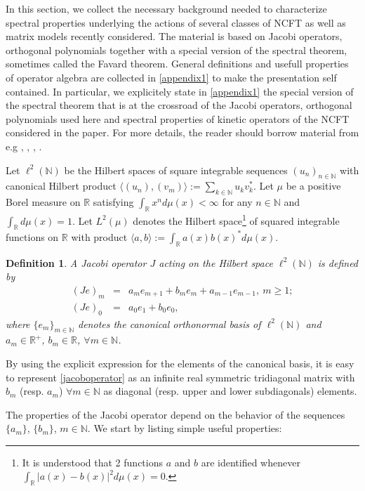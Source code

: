 \documentclass[a4paper]{jpconf}
\numberwithin{equation}{section}
\newtheorem{definition}[Theorem]{Definition}
\theoremstyle{nonumberplain}
\begin{document}
In this section, we collect the necessary background needed to characterize spectral properties underlying the actions of several classes of NCFT as well as matrix models recently considered. The material is based on Jacobi operators, orthogonal polynomials together with a special version of the spectral theorem, sometimes called the Favard theorem. General definitions and usefull properties of operator algebra are collected in \ref{appendix1} to make the presentation self contained. In particular, we explicitely state in \ref{appendix1} the special version of the spectral theorem that is at the crossroad of the Jacobi operators, orthogonal polynomials used here and spectral properties of kinetic operators of the NCFT considered in the paper. For more details, the reader should borrow material from e.g \cite{akhiez:1965}, \cite{Gszego}, \cite{bsimon}, \cite{teschl}.\par
Let $\ell^2(\mathbb{N})$ be the Hilbert spaces of square integrable sequences $(u_n)_{n\in\mathbb{N}}$ with canonical Hilbert product $\langle (u_n),(v_m)\rangle:=\sum_{k\in\mathbb{N}}u_kv_k^*$. Let $\mu$ be a positive Borel measure on $\mathbb{R}$ satisfying $\int_\mathbb{R} x^nd\mu(x)<\infty$ for any $n\in\mathbb{N}$ and $\int_\mathbb{R} d\mu(x)=1$. Let $L^2(\mu)$ denotes the Hilbert space{\footnote{It is understood that 2 functions $a$ and $b$ are identified whenever $\int_\mathbb{R}\vert a(x)-b(x) \vert^2d\mu(x)=0$.}} of squared integrable functions on $\mathbb{R}$ with product $\langle a,b\rangle:=\int_\mathbb{R}a(x)b(x)^*d\mu(x)$. 
\begin{definition}\label{defin-jacobi}
A Jacobi operator $J$ acting on the Hilbert space $\ell^2(\mathbb{N})$ is defined by
\begin{eqnarray}
(Je)_m&=&a_me_{m+1}+b_me_m+a_{m-1}e_{m-1},\ m\ge1;\nonumber\\ 
(Je)_0&=&a_0e_1+b_0e_0 \label{jacoboperator},
\end{eqnarray}
where $\{e_m\}_{m\in\mathbb{N}}$ denotes the canonical orthonormal basis of $\ell^2(\mathbb{N})$ and $a_m\in\mathbb{R}^+$, $b_m\in\mathbb{R}$, $\forall m\in\mathbb{N}$.
\end{definition}
By using the explicit expression for the elements of the canonical basis, it is easy to represent \eqref{jacoboperator} as an infinite real symmetric tridiagonal matrix with $b_m$ (resp. $a_m$) $\forall m\in\mathbb{N}$ as diagonal (resp. upper and lower subdiagonals) elements. \par 
The properties of the Jacobi operator depend on the behavior of the sequences $\{a_m\}$, $\{b_m\}$, $m\in\mathbb{N}$. We start by listing simple useful properties:
\end{document}
